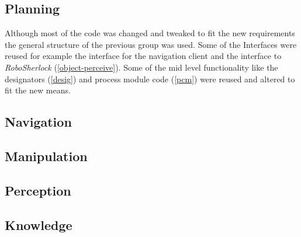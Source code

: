\documentclass[main.tex]{subfiles}
\begin{document}
	\subsection{Planning}
		Although most of the code was changed and tweaked to fit the new requirements the general structure of the previous group was used. Some of the Interfaces were reused for example the interface for the navigation client and the interface to \textit{RoboSherlock} (\ref{object-perceive}). Some of the mid level functionality like the designators (\ref{desig}) and process module code (\ref{pcm}) were reused and altered to fit the new means.
	\subsection{Navigation}
	\subsection{Manipulation}
	\subsection{Perception}
	\subsection{Knowledge}
\end{document}
